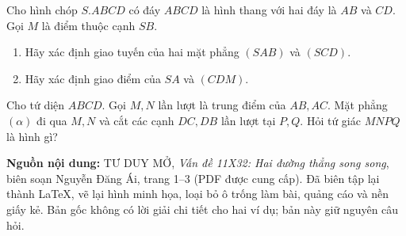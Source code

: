 \documentclass[11pt,a4paper]{article}
\newcommand{\sectitle}[2]{\vspace{4pt}\noindent{\large\bfseries\textcolor{questionpurple}{#1.\ #2}}\par\vspace{3pt}}
\newcommand{\exampletitle}[2]{\vspace{3pt}\noindent{\bfseries\textcolor{answerblue}{Ví dụ #1.}} #2\par\vspace{2pt}}
\begin{document}
\sectitle{3}{Ví dụ vận dụng}

\exampletitle{01 [TDM31]}{Cho hình chóp $S.ABCD$ có đáy $ABCD$
là hình thang với hai đáy là $AB$ và $CD$. Gọi $M$ là điểm
thuộc cạnh $SB$.}
\begin{enumerate}
  \item Hãy xác định giao tuyến của hai mặt phẳng $(SAB)$ và $(SCD)$.
  \item Hãy xác định giao điểm của $SA$ và $(CDM)$.
\end{enumerate}

\exampletitle{02 [TDM31]}{Cho tứ diện $ABCD$. Gọi $M,N$ lần lượt
là trung điểm của $AB,AC$. Mặt phẳng $(\alpha)$ đi qua $M,N$
và cắt các cạnh $DC,DB$ lần lượt tại $P,Q$.
Hỏi tứ giác $MNPQ$ là hình gì?}

\vspace{2mm}
\begin{tcolorbox}[colback=white,colframe=black!35,boxrule=.4pt,arc=0mm,
 left=2mm,right=2mm,top=1mm,bottom=1mm]
\footnotesize
\textbf{Nguồn nội dung:} TƯ DUY MỞ,
\emph{Vấn đề 11X32: Hai đường thẳng song song},
biên soạn Nguyễn Đăng Ái, trang 1--3 (PDF được cung cấp).
Đã biên tập lại thành LaTeX, vẽ lại hình minh họa, loại bỏ
ô trống làm bài, quảng cáo và nền giấy kẻ.
Bản gốc không có lời giải chi tiết cho hai ví dụ; bản này giữ nguyên câu hỏi.
\end{tcolorbox}
\end{document}
